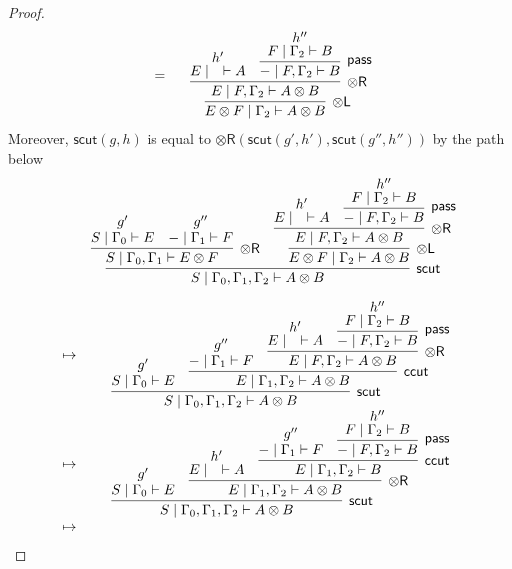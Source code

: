 \documentclass[sn-mathphys-num]{sn-jnl}%
\newcommand{\GG}{\Gamma}
\newcommand{\vd}{\vdash}
\newcommand{\tl}{\otimes \mathsf{L}}
\newcommand{\tr}{\otimes\mathsf{R}}
\newcommand{\pass}{\mathsf{pass}}
\newcommand{\ot}{\otimes}
\newcommand{\mf}[1]{\mathsf{#1}}
\newcommand{\scut}[2]{\mf{scut} (#1 , #2)}
\theoremstyle{thmstyleone}%
\theoremstyle{thmstyletwo}%
\theoremstyle{thmstylethree}%
\begin{document}
\begin{proof}
\begin{displaymath}
\begin{array}{c}
    \quad
    =
    \quad
    \begin{array}{c}
      \infer[\tl]{E \ot F \mid \GG_2 \vd A \ot B}{
      \infer[\tr]{E \mid F , \GG_2 \vd A \ot B}{
        \deduce{E \mid \quad \vd A}{h'}
        &
        \infer[\pass]{{-} \mid F , \GG_2 \vd B}{
          \deduce{F \mid \GG_2 \vd B}{h''}
        }
      }
    }
    \end{array}
  \end{array}
\end{displaymath}
Moreover, $\scut{g}{h}$ is equal to $\tr (\scut{g'}{h'} , \scut{g''}{h''})$ by the path below
\begin{displaymath}
  \begin{array}{lc}
  &
    \infer[\mf{scut}]{S \mid \GG_0 , \GG_1 , \GG_2 \vd A \ot B}{
      \infer[\tr]{S \mid \GG_0 , \GG_1 \vd E \ot F}{
      \deduce{S \mid \GG_0 \vd E}{g'}
      &
      \deduce{{-} \mid \GG_1 \vd F}{g''}
    }
      &
      \infer[\tl]{E \ot F \mid \GG_2 \vd A \ot B}{
      \infer[\tr]{E \mid F , \GG_2 \vd A \ot B}{
        \deduce{E \mid \quad \vd A}{h'}
        &
        \infer[\pass]{{-} \mid F , \GG_2 \vd B}{
          \deduce{F \mid \GG_2 \vd B}{h''}
        }
      }
    }
    }
    \\[10pt]
    \mapsto&
    \quad
    \begin{array}{c}
    \infer[\mf{scut}]{S \mid \GG_0 , \GG_1 , \GG_2 \vd A \ot B}{
      \deduce{S \mid \GG_0 \vd E}{g'}
      &
      \infer[\mf{ccut}]{E \mid \GG_1 , \GG_2 \vd A \ot B}{
        \deduce{{-} \mid \GG_1 \vd F}{g''}
        &
        \infer[\tr]{E \mid F , \GG_2 \vd A \ot B}{
        \deduce{E \mid \quad \vd A}{h'}
        &
        \infer[\pass]{{-} \mid F , \GG_2 \vd B}{
          \deduce{F \mid \GG_2 \vd B}{h''}
        }
      }
      }
    }
    \end{array}
    \\[20pt]
    \mapsto&
    \quad
    \begin{array}{c}
      \infer[\mf{scut}]{S \mid \GG_0 , \GG_1 , \GG_2 \vd A \ot B}{
      \deduce{S \mid \GG_0 \vd E}{g'}
      &
      \infer[\tr]{E \mid \GG_1 , \GG_2 \vd A \ot B}{
        \deduce{E \mid \quad \vd A}{h'}
        &
        \infer[\mf{ccut}]{E \mid \GG_1, \GG_2 \vd B}{
        \deduce{{-}\mid \GG_1 \vd F}{g''}
        &
        \infer[\pass]{{-} \mid F , \GG_2 \vd B}{
          \deduce{F \mid \GG_2 \vd B}{h''}
        }
      }
      }
    }
    \end{array}
    \\[20pt]
    \mapsto&
    \quad
    \begin{array}{c}

\end{array}
\end{array}
\end{displaymath}
\end{proof}
\end{document}
